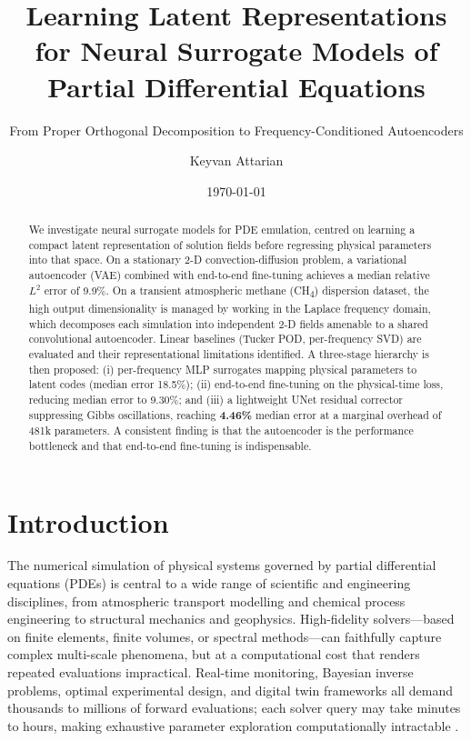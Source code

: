 \documentclass[a4paper]{article}
\author{Keyvan Attarian}
\date{\today}
\title{Learning Latent Representations for Neural Surrogate Models of Partial Differential Equations}
\subtitle{From Proper Orthogonal Decomposition to Frequency-Conditioned Autoencoders}
\begin{document}
\maketitle

\begin{abstract}
We investigate neural surrogate models for PDE emulation, centred on learning a compact latent representation of solution fields before regressing physical parameters into that space. On a stationary 2-D convection-diffusion problem, a variational autoencoder (VAE) combined with end-to-end fine-tuning achieves a median relative $L^2$ error of 9.9\%. On a transient atmospheric methane (CH\textsubscript{4}) dispersion dataset, the high output dimensionality is managed by working in the Laplace frequency domain, which decomposes each simulation into independent 2-D fields amenable to a shared convolutional autoencoder. Linear baselines (Tucker POD, per-frequency SVD) are evaluated and their representational limitations identified. A three-stage hierarchy is then proposed: (i) per-frequency MLP surrogates mapping physical parameters to latent codes (median error 18.5\%); (ii) end-to-end fine-tuning on the physical-time loss, reducing median error to 9.30\%; and (iii) a lightweight UNet residual corrector suppressing Gibbs oscillations, reaching \textbf{4.46\%} median error at a marginal overhead of 481k parameters. A consistent finding is that the autoencoder is the performance bottleneck and that end-to-end fine-tuning is indispensable.
\end{abstract}

\tableofcontents
\newpage

\section{Introduction}

The numerical simulation of physical systems governed by partial differential equations (PDEs) is central to a wide range of scientific and engineering disciplines, from atmospheric transport modelling and chemical process engineering to structural mechanics and geophysics. High-fidelity solvers—based on finite elements, finite volumes, or spectral methods—can faithfully capture complex multi-scale phenomena, but at a computational cost that renders repeated evaluations impractical. Real-time monitoring, Bayesian inverse problems, optimal experimental design, and digital twin frameworks all demand thousands to millions of forward evaluations; each solver query may take minutes to hours, making exhaustive parameter exploration computationally intractable \cite{ammar2024hybrid,quarteroni2025}.
\end{document}

